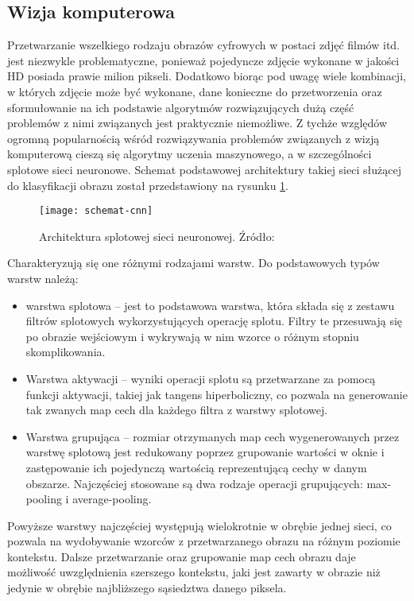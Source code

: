 \subsection{Wizja komputerowa}
Przetwarzanie wszelkiego rodzaju obrazów cyfrowych w postaci zdjęć filmów itd. jest niezwykle problematyczne, ponieważ pojedyncze zdjęcie wykonane w jakości HD posiada prawie milion pikseli. Dodatkowo biorąc pod uwagę wiele kombinacji, w których zdjęcie może być wykonane, dane konieczne do przetworzenia oraz sformułowanie na ich podstawie algorytmów rozwiązujących dużą część problemów z nimi związanych jest praktycznie niemożliwe. Z tychże względów ogromną popularnością wśród rozwiązywania problemów związanych z wizją komputerową cieszą się algorytmy uczenia maszynowego, a w szczególności splotowe sieci neuronowe. Schemat podstawowej architektury takiej sieci służącej do klasyfikacji obrazu został przedstawiony na rysunku \ref{fig:schemat-cnn}.
\begin{figure}[H]
  \centering
  \texttt{[image: schemat-cnn]}
  \caption{Architektura splotowej sieci neuronowej. Źródło: \cite{WikipediaEN:CNN}}
  \label{fig:schemat-cnn}
\end{figure}
\noindent Charakteryzują się one różnymi rodzajami warstw. Do podstawowych typów warstw należą:
\begin{itemize}
  \item warstwa splotowa -- jest to podstawowa warstwa, która składa się z zestawu filtrów splotowych wykorzystujących operację splotu. Filtry te przesuwają się po obrazie wejściowym i wykrywają w nim wzorce o różnym stopniu skomplikowania.
  \item Warstwa aktywacji -- wyniki operacji splotu są przetwarzane za pomocą funkcji aktywacji, takiej jak tangens hiperboliczny, co pozwala na generowanie tak zwanych map cech dla każdego filtra z warstwy splotowej.
  \item Warstwa grupująca -- rozmiar otrzymanych map cech wygenerowanych przez warstwę splotową jest redukowany poprzez grupowanie wartości w oknie i zastępowanie ich pojedynczą wartością reprezentującą cechy w danym obszarze. Najczęściej stosowane są dwa rodzaje operacji grupujących: max-pooling i average-pooling.
\end{itemize}
Powyższe warstwy najczęściej występują wielokrotnie w obrębie jednej sieci, co pozwala na wydobywanie wzorców z przetwarzanego obrazu na różnym poziomie kontekstu. Dalsze przetwarzanie oraz grupowanie map cech obrazu daje możliwość uwzględnienia szerszego kontekstu, jaki jest zawarty w obrazie niż jedynie w obrębie najbliższego sąsiedztwa danego piksela.
